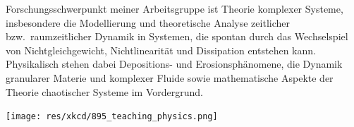 \begin{multicols}{2}
Forschungsschwerpunkt meiner Arbeitsgruppe ist Theorie komplexer Systeme, insbesondere die Modellierung und theoretische Analyse zeitlicher bzw.\ raumzeitlicher Dynamik in Systemen, die spontan durch das Wechselspiel von Nichtgleichgewicht, Nichtlinearität und Dissipation entstehen kann. Physikalisch stehen dabei Depositions- und Erosionsphänomene, die Dynamik granularer Materie und komplexer Fluide sowie mathematische Aspekte der Theorie chaotischer Systeme im Vordergrund.

\end{multicols}

\begin{center}
	\texttt{[image: res/xkcd/895\_teaching\_physics.png]}
\end{center}

\newpage

\vspace*{\fill}


